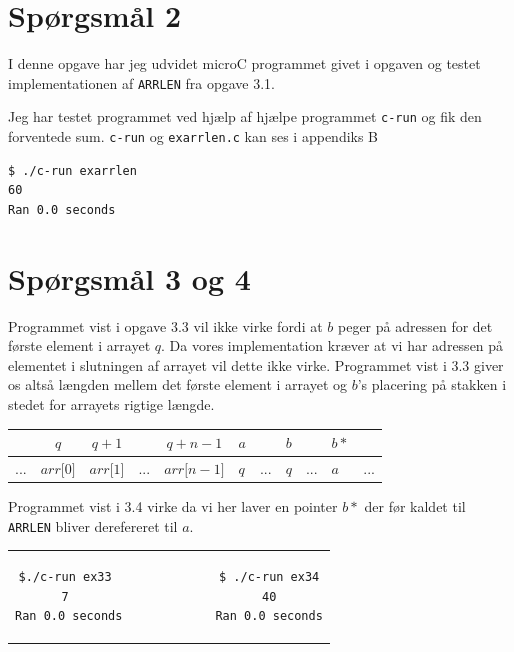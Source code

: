 \documentclass[danish,a4paper]{report}
\begin{document}
\section*{Spørgsmål 2}

I denne opgave har jeg udvidet microC programmet givet i opgaven og testet implementationen af \texttt{ARRLEN} fra opgave 3.1.



Jeg har testet programmet ved hjælp af hjælpe programmet \texttt{c-run} og fik den forventede sum. \texttt{c-run} og \texttt{exarrlen.c} kan ses i appendiks B

\begin{lstlisting}[language=bash]
$ ./c-run exarrlen
60
Ran 0.0 seconds
\end{lstlisting}

\section*{Spørgsmål 3 og 4}

Programmet vist i opgave 3.3 vil ikke virke fordi at $b$ peger på adressen for det første element i arrayet $q$. Da vores implementation kræver at vi har adressen på elementet i slutningen af arrayet vil dette ikke virke. Programmet vist i 3.3 giver os altså længden mellem det første element i arrayet og $b$'s placering på stakken i stedet for arrayets rigtige længde.

\begin{table}[h]
\centering
\begin{tabular}{ccccccccccc}
& $q$ & $q+1$ & & $q+n-1$ & $a$ & & $b$ & & $b*$ & \\  \hline
\multicolumn{1}{l|}{...} & \multicolumn{1}{l|}{$arr{[}0{]}$} & \multicolumn{1}{l|}{$arr{[}1{]}$} & \multicolumn{1}{l|}{...} & \multicolumn{1}{l|}{$arr{[}n-1{]}$} & \multicolumn{1}{l|}{$q$} & \multicolumn{1}{l|}{...} & \multicolumn{1}{l|}{$q$} & \multicolumn{1}{l|}{...} & \multicolumn{1}{l|}{$a$} & ... \\ \hline
\end{tabular}
\end{table}

Programmet vist i 3.4 virke da vi her laver en pointer $b*$ der før kaldet til \texttt{ARRLEN} bliver derefereret til $a$.\\
\begin{center}
\begin{tabular}{c}
\begin{lstlisting}[language=bash]
$./c-run ex33               $ ./c-run ex34
7                           40
Ran 0.0 seconds             Ran 0.0 seconds

\end{lstlisting}
\end{tabular}
\end{center}
\end{document}
